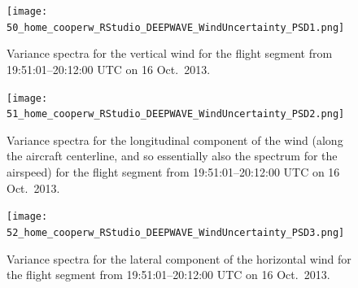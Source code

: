 \documentclass[12pt,twoside,english]{article}\usepackage[]{graphicx}\usepackage[]{color}
\let\OrgIndex\index
\renewcommand*{\index}[1]{\OrgIndex{#1}}
\begin{document}

\begin{figure}
\noindent \begin{centering}
\texttt{[image: 50\_home\_cooperw\_RStudio\_DEEPWAVE\_WindUncertainty\_PSD1.png]}  
\par\end{centering}

\protect\protect\protect\caption{\label{fig:AppxB-PSD1}Variance spectra for the vertical wind for the flight segment from 19:51:01--20:12:00 UTC on 16 Oct.\ 2013.} 
\end{figure}
\begin{figure}
\noindent \begin{centering}
\texttt{[image: 51\_home\_cooperw\_RStudio\_DEEPWAVE\_WindUncertainty\_PSD2.png]}  
\par\end{centering}

\protect\caption{\label{fig:AppxB-PSD2}Variance spectra for the longitudinal component of the wind (along the aircraft centerline, and so essentially also the spectrum for the airspeed) for the flight segment from 19:51:01--20:12:00 UTC on 16 Oct.\ 2013.} 
\end{figure}

\begin{figure}
\noindent \begin{centering}
\texttt{[image: 52\_home\_cooperw\_RStudio\_DEEPWAVE\_WindUncertainty\_PSD3.png]}  
\par\end{centering}

\protect\caption{\label{fig:AppxB-PSD3}Variance spectra for the lateral component of the horizontal wind for the flight segment from 19:51:01--20:12:00 UTC on 16 Oct.\ 2013.} 
\end{figure}


% 
% 
\end{document}
